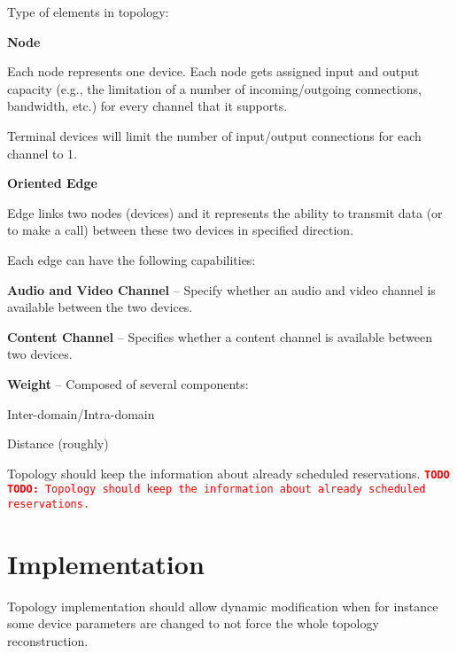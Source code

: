 \documentclass[a4paper]{report}
\newcommand{\TODO}[1]{%
\def\empty{}%
\def\prvniparametr{#1}%
\ifx\prvniparametr\empty%
\begingroup\tt\textcolor{red}{\noindent\textbf{TODO}}\endgroup
\else%
\begingroup\tt\textcolor{red}{\noindent\textbf{TODO:}\ #1}\endgroup
\fi%
}
\begin{document}
Type of elements in topology:
\begin{itemize}

\item{\textbf{Node}} 

Each node represents one device.
Each node gets assigned input and output capacity (e.g., the limitation of 
a number of incoming/outgoing connections, bandwidth, etc.) for every channel
that it supports.

Terminal devices will limit the number of input/output connections for each
channel to 1.

   

\item{\textbf{Oriented Edge}} 

Edge links two nodes (devices) and it represents the 
ability to transmit data (or to make a call) between these two devices 
in specified direction.
  
Each edge can have the following capabilities:
\begin{compactitem}   
  \item \textbf{Audio and Video Channel} -- Specify whether an audio and video channel is available between the two devices.
      
  \item \textbf{Content Channel} -- Specifies whether a content channel is available between two devices.
    
  \item \textbf{Weight} -- Composed of several components:
  \begin{compactitem}  
    \item Inter-domain/Intra-domain
    \item Distance (roughly)
  \end{compactitem}  
\end{compactitem}   

\end{itemize}

\TODO{Topology should keep the information about already scheduled reservations.}
  

\section{Implementation}
Topology implementation should allow dynamic modification when for instance some device parameters are changed to not force the whole topology reconstruction.
      
\end{document}
